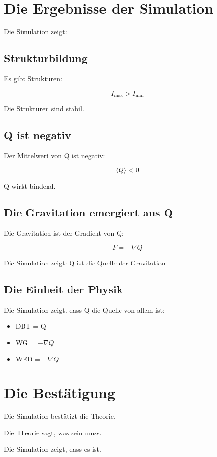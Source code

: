 
\section{Die Ergebnisse der Simulation}

Die Simulation zeigt:

\subsection{Strukturbildung}

Es gibt Strukturen:

\[
I_{\text{max}} > I_{\text{min}}
\]

Die Strukturen sind stabil.

\subsection{Q ist negativ}

Der Mittelwert von Q ist negativ:

\[
\langle Q \rangle < 0
\]

Q wirkt bindend.

\subsection{Die Gravitation emergiert aus Q}

Die Gravitation ist der Gradient von Q:

\[
F = -\nabla Q
\]

Die Simulation zeigt: Q ist die Quelle der Gravitation.

\subsection{Die Einheit der Physik}

Die Simulation zeigt, dass Q die Quelle von allem ist:

\begin{itemize}
    \item DBT = Q
    \item WG = \( -\nabla Q \)
    \item WED = \( -\nabla Q \)
\end{itemize}

\section{Die Bestätigung}

Die Simulation bestätigt die Theorie.

Die Theorie sagt, was sein muss.

Die Simulation zeigt, dass es ist.